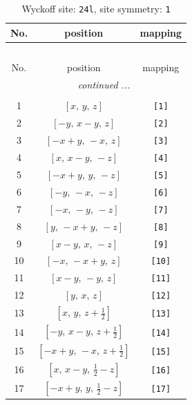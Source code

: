 \documentclass[fleqn,8pt]{jsarticle}
\begin{document}
\begin{longtable}{ccc}
\caption{Wyckoff site: {\tt 24l}, site symmetry: {\tt 1}}
 \\
 \hline \hline
No. & position & mapping \\ \hline \endfirsthead

\multicolumn{2}{l}{\tablename\ \thetable{}} \\
 \hline \hline
No. & position & mapping \\ \hline \endhead

 \hline \hline
\multicolumn{2}{r}{\footnotesize\it continued ...} \\ \endfoot

 \hline \hline
\multicolumn{2}{r}{} \\ \endlastfoot

1 & $\left[ x,\, y,\, z \right]$ & {\tt [1]} \\ \hline
2 & $\left[ - y,\, x - y,\, z \right]$ & {\tt [2]} \\ \hline
3 & $\left[ - x + y,\, - x,\, z \right]$ & {\tt [3]} \\ \hline
4 & $\left[ x,\, x - y,\, - z \right]$ & {\tt [4]} \\ \hline
5 & $\left[ - x + y,\, y,\, - z \right]$ & {\tt [5]} \\ \hline
6 & $\left[ - y,\, - x,\, - z \right]$ & {\tt [6]} \\ \hline
7 & $\left[ - x,\, - y,\, - z \right]$ & {\tt [7]} \\ \hline
8 & $\left[ y,\, - x + y,\, - z \right]$ & {\tt [8]} \\ \hline
9 & $\left[ x - y,\, x,\, - z \right]$ & {\tt [9]} \\ \hline
10 & $\left[ - x,\, - x + y,\, z \right]$ & {\tt [10]} \\ \hline
11 & $\left[ x - y,\, - y,\, z \right]$ & {\tt [11]} \\ \hline
12 & $\left[ y,\, x,\, z \right]$ & {\tt [12]} \\ \hline
13 & $\left[ x,\, y,\, z + \frac{1}{2} \right]$ & {\tt [13]} \\ \hline
14 & $\left[ - y,\, x - y,\, z + \frac{1}{2} \right]$ & {\tt [14]} \\ \hline
15 & $\left[ - x + y,\, - x,\, z + \frac{1}{2} \right]$ & {\tt [15]} \\ \hline
16 & $\left[ x,\, x - y,\, \frac{1}{2} - z \right]$ & {\tt [16]} \\ \hline
17 & $\left[ - x + y,\, y,\, \frac{1}{2} - z \right]$ & {\tt [17]} \\ \hline

\end{longtable}
\end{document}
